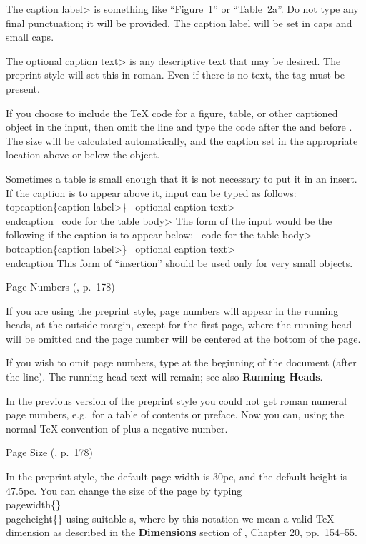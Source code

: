 The \<caption label> is something like ``Figure~1'' or ``Table~2a''.
Do not type any final punctuation; it will be provided.  The caption
label will be set in caps and small caps.

The \<optional caption text> is any descriptive text that may be desired. 
The preprint style will set this in roman.  Even if there is no text, the
 tag must be present.

If you choose to include the \TeX{} code for a figure, table, or other
captioned object in the input, then omit the  line
and type the code after the  and before .
The size will be calculated automatically, and the caption set in the
appropriate location above or below the object.

Sometimes a table is small enough that it is not necessary to put it in an
insert.  If the caption is to appear above it, input can be typed as follows:
\beginexample{}
\\topcaption\{\<caption label>\}
\ \<optional caption text>
\\endcaption
\ \<code for the table body>
\endexample
\noindent
The form of the input would be the following if the caption is to appear below:
\beginexample{}
\ \<code for the table body>
\\botcaption\{\<caption label>\}
\ \<optional caption text>
\\endcaption
\endexample
\noindent
This form of ``insertion'' should be used only for very small objects.


\subhead Page Numbers {\rm (\Joy, p.~178)}
\endsubhead

If you are using the preprint style, page numbers will appear in the running
heads, at the outside margin, except for the first page, where the running head
will be omitted and the page number will be centered at the bottom of the page.

If you wish to omit page numbers, type  at the
beginning of the document (after the  line).
The running head text will remain; see also {\bf Running Heads}.

In the previous version of the preprint style you could not get roman
numeral page numbers, e.g.\ for a table of contents or preface.  Now you
can, using the normal \TeX{} convention of  plus a negative
number.


\subhead Page Size {\rm (\Joy, p.~178)}
\endsubhead

In the preprint style, the default page width is 30pc, and the default
height is 47.5pc. 
You can change the size of the page by typing
\beginexample{}
\\pagewidth\{\Dimen\}\newline
\\pageheight\{\Dimen\}
\endexample
\noindent using suitable \Dimen{}s, where by this notation we mean
a valid \TeX{} dimension as described in the {\bf Dimensions} section of
\Joy, Chapter 20, pp.~154--55.


